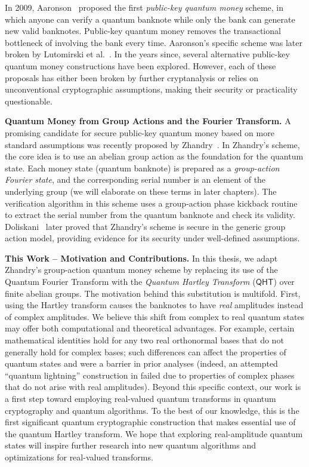 \documentclass[12pt]{report}
\newcommand{\qht}{\mathsf{QHT}}
\begin{document}
In 2009, Aaronson~\cite{Aaronson2009} proposed the first \emph{public-key quantum money} scheme, in which anyone can verify a quantum banknote while only the bank can generate new valid banknotes. Public-key quantum money removes the transactional bottleneck of involving the bank every time. Aaronson’s specific scheme was later broken by Lutomirski et al.~\cite{Lutomirski2010}. In the years since, several alternative public-key quantum money constructions have been explored. However, each of these proposals has either been broken by further cryptanalysis or relies on unconventional cryptographic assumptions, making their security or practicality questionable.

\medskip\noindent\textbf{Quantum Money from Group Actions and the Fourier Transform.} 
A promising candidate for secure public-key quantum money based on more standard assumptions was recently proposed by Zhandry~\cite{Zhandry2022}. In Zhandry’s scheme, the core idea is to use an abelian group action as the foundation for the quantum state. Each money state (quantum banknote) is prepared as a \emph{group-action Fourier state}, and the corresponding serial number is an element of the underlying group (we will elaborate on these terms in later chapters). The verification algorithm in this scheme uses a group-action phase kickback routine to extract the serial number from the quantum banknote and check its validity. Doliskani~\cite{Doliskani2023} later proved that Zhandry’s scheme is secure in the generic group action model, providing evidence for its security under well-defined assumptions.

\medskip\noindent\textbf{This Work – Motivation and Contributions.} 
In this thesis, we adapt Zhandry’s group-action quantum money scheme by replacing its use of the Quantum Fourier Transform with the \emph{Quantum Hartley Transform} ($\qht$) over finite abelian groups. The motivation behind this substitution is multifold. First, using the Hartley transform causes the banknotes to have \emph{real} amplitudes instead of complex amplitudes. We believe this shift from complex to real quantum states may offer both computational and theoretical advantages. For example, certain mathematical identities hold for any two real orthonormal bases that do not generally hold for complex bases; such differences can affect the properties of quantum states and were a barrier in prior analyses (indeed, an attempted “quantum lightning” construction in \cite{Zhandry2022} failed due to properties of complex phases that do not arise with real amplitudes). Beyond this specific context, our work is a first step toward employing real-valued quantum transforms in quantum cryptography and quantum algorithms. To the best of our knowledge, this is the first significant quantum cryptographic construction that makes essential use of the quantum Hartley transform. We hope that exploring real-amplitude quantum states will inspire further research into new quantum algorithms and optimizations for real-valued transforms.
\end{document}
